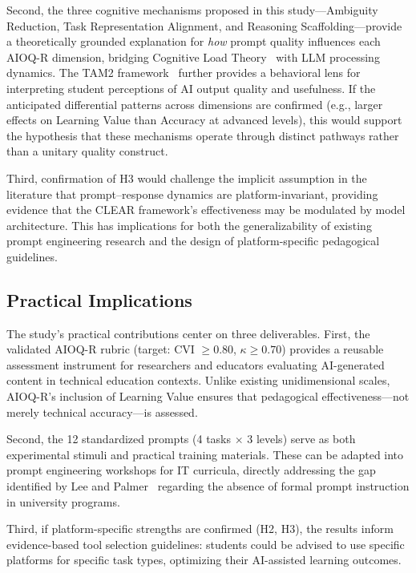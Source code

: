 \documentclass[runningheads]{llncs}
\begin{document}
Second, the three cognitive mechanisms proposed in this study---Ambiguity Reduction, Task Representation Alignment, and Reasoning Scaffolding---provide a theoretically grounded explanation for \emph{how} prompt quality influences each AIOQ-R dimension, bridging Cognitive Load Theory~\cite{Sweller1988} with LLM processing dynamics. The TAM2 framework~\cite{Venkatesh2000} further provides a behavioral lens for interpreting student perceptions of AI output quality and usefulness. If the anticipated differential patterns across dimensions are confirmed (e.g., larger effects on Learning Value than Accuracy at advanced levels), this would support the hypothesis that these mechanisms operate through distinct pathways rather than a unitary quality construct.

Third, confirmation of H3 would challenge the implicit assumption in the literature that prompt--response dynamics are platform-invariant, providing evidence that the CLEAR framework's effectiveness may be modulated by model architecture. This has implications for both the generalizability of existing prompt engineering research and the design of platform-specific pedagogical guidelines.

\subsection{Practical Implications}

The study's practical contributions center on three deliverables. First, the validated AIOQ-R rubric (target: CVI $\geq 0.80$, $\kappa \geq 0.70$) provides a reusable assessment instrument for researchers and educators evaluating AI-generated content in technical education contexts. Unlike existing unidimensional scales, AIOQ-R's inclusion of Learning Value ensures that pedagogical effectiveness---not merely technical accuracy---is assessed.

Second, the 12 standardized prompts (4 tasks $\times$ 3 levels) serve as both experimental stimuli and practical training materials. These can be adapted into prompt engineering workshops for IT curricula, directly addressing the gap identified by Lee and Palmer~\cite{Lee2025} regarding the absence of formal prompt instruction in university programs.

Third, if platform-specific strengths are confirmed (H2, H3), the results inform evidence-based tool selection guidelines: students could be advised to use specific platforms for specific task types, optimizing their AI-assisted learning outcomes.
\end{document}
